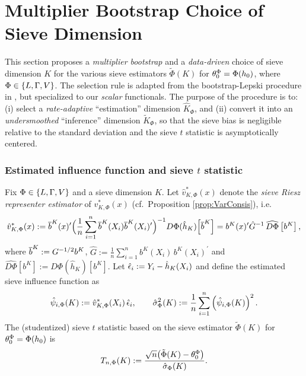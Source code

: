\documentclass[12pt,american]{article}
\theoremstyle{definition}
\theoremstyle{plain}
\theoremstyle{definition}
\theoremstyle{plain}
\theoremstyle{plain}
\theoremstyle{plain}
\theoremstyle{plain}
\theoremstyle{plain}
\begin{document}
\section{Multiplier Bootstrap Choice of Sieve Dimension}
\label{subsec:MB_K_LOO}

This section proposes a \emph{multiplier bootstrap}  and a \emph{data-driven} choice of sieve
dimension $K$ for the various sieve estimators $\tilde{\Phi}(K)$ for $\theta_0^{\Phi}=\Phi(h_0)$, where $\Phi \in\{L,\Gamma,V\}$.
The selection rule is adapted from the bootstrap-Lepski procedure in
\citet*[Procedure~1]{chen2025adaptive}, but specialized to our \emph{scalar}
functionals.
The purpose of the procedure is to: (i) select a \emph{rate-adaptive} ``estimation'' dimension $\hat K_{\Phi}$,
and (ii) convert it into an \emph{undersmoothed} ``inference'' dimension $\tilde K_{\Phi}$, so that the
sieve bias is negligible relative to the standard deviation and the sieve $t$ statistic is asymptotically
centered.

\subsubsection*{Estimated influence function and sieve $t$ statistic}

Fix $\Phi \in\{L,\Gamma,V\}$ and a sieve dimension $K$.
Let $\hat v_{K,\Phi}^*(x)$ denote the \emph{sieve Riesz representer estimator} of
$v_{K,\Phi}^*(x)$ (cf.\ Proposition \ref{prop:VarConsis}), i.e.
\begin{equation}
  \hat v_{K,\Phi}^*(x)
  := \overline{b}^{K}(x)^\prime\Big(\frac1n\sum_{i=1}^n \overline{b}^{K}(X_i)\overline{b}^{K}(X_i)^\prime\Big)^{-1}
  D\Phi (\hat{h}_K)\!\left[\overline{b}^{K}\right]=b^{K}(x)^\prime \hat G^{-1}\,\widehat{D\Phi}\left[ b^{K}\right],
  \label{eq:MB_vhat}
\end{equation}
where $\overline{b}^{K}:=G^{-1/2}b^{K}$, $\hat G := \frac{1}{n}\sum_{i=1}^n b^{K}(X_i)\,b^{K}(X_i)^\prime$ and $\widehat{D\Phi}\left[ b^{K}\right]:= D\Phi (\hat{h}_K)\!\left[ b^{K}\right]$.
Let $\hat{\epsilon}_i:=Y_i-\hat h_K (X_i)$ and define the estimated sieve influence function as
\begin{equation}
  \hat\psi_{i,\Phi}(K):=\hat v_{K,\Phi}^*(X_i)\,\hat{\epsilon}_i,
  \qquad
  \hat\sigma_{\Phi}^2(K):=\frac1n\sum_{i=1}^n \left(\hat\psi_{i,\Phi}(K)\right)^2.
  \label{eq:MB_psihat}
\end{equation}
The (studentized) sieve $t$ statistic based on the sieve estimator $\tilde{\Phi}(K)$ for $\theta_0^{\Phi}=\Phi(h_0)$ is
\begin{equation}
  T_{n,\Phi}(K)
  :=\frac{\sqrt n\big(\tilde{\Phi}(K)-\theta_0^{\Phi}\big)}{\hat\sigma_{\Phi}(K)}.
  \label{eq:MB_tstat}
\end{equation}
\end{document}
